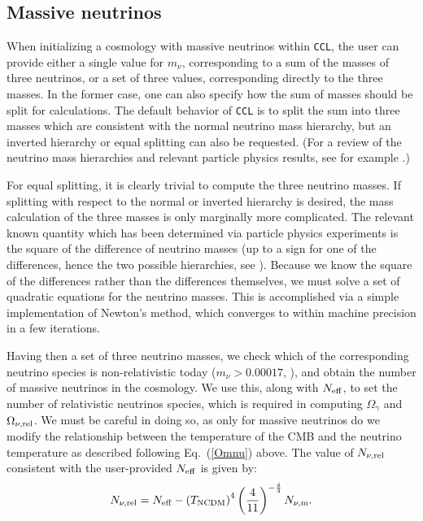 \documentclass[\docopts]{\docclass}
\newcommand{\ccl}{{\tt CCL}\xspace}
\begin{document}
\subsection{Massive neutrinos}

When initializing a cosmology with massive neutrinos within \ccl , the user can provide either a single value for $m_\nu$, corresponding to a sum of the masses of three neutrinos, or a set of three values, corresponding directly to the three masses. In the former case, one can also specify how the sum of masses should be split for calculations. The default behavior of \ccl is to split the sum into three masses which are consistent with the normal neutrino mass hierarchy, but an inverted hierarchy or equal splitting can also be requested. (For a review of the neutrino mass hierarchies and relevant particle physics results, see for example \citealt{Gerbino2017, Lesgourgues2012}.)

For equal splitting, it is clearly trivial to compute the three neutrino masses. If splitting with respect to the normal or inverted hierarchy is desired, the mass calculation of the three masses is only marginally more complicated. The relevant known quantity which has been determined via particle physics experiments is the square of the difference of neutrino masses (up to a sign for one of the differences, hence the two possible hierarchies, see \cite{Lesgourgues2012, Gerbino2017}). Because we know the square of the differences rather than the differences themselves, we must solve a set of quadratic equations for the neutrino masses. This is accomplished via a simple implementation of Newton's method, which converges to within machine precision in a few iterations.

Having then a set of three neutrino masses, we check which of the corresponding neutrino species is non-relativistic today ($m_\nu>0.00017$, \citealt{Lesgourgues2012}), and obtain the number of massive neutrinos in the cosmology. We use this, along with $N_{\rm eff}$, to set the number of relativistic neutrinos species, which is required in computing $\Omega_\gamma$ and $\Omega_{\nu, {\rm rel}}$. We must be careful in doing so, as only for massive neutrinos do we modify the relationship between the temperature of the CMB and the neutrino temperature as described following Eq.~(\ref{Omnu}) above. The value of $N_{\nu, {\rm rel}}$ consistent with the user-provided $N_{\rm eff}$ is given by:
\begin{equation}
N_{\nu, {\rm rel}} = N_{\rm eff} - \left(T_{\rm NCDM}\right)^{4} \left(\frac{4}{11}\right)^{-\frac{4}{3}} N_{\nu, {\rm m}}.
\label{Nnurel}
\end{equation}
\end{document}
